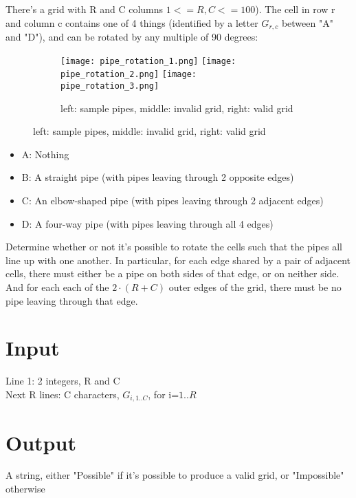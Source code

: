 

There's a grid with R and C columns $1 <= R, C <= 100$). The cell in row r and column c contains 
one of 4 things (identified by a letter $G_{r,c}$ between "A" and "D"), and can be rotated by any multiple 
of 90 degrees:


\begin{figure}[h]
  \begin{subfigure}{\linewidth}
    \texttt{[image: pipe\_rotation\_1.png]} \hfill
    \texttt{[image: pipe\_rotation\_2.png]} \hfill
    \texttt{[image: pipe\_rotation\_3.png]}
    \caption{left: sample pipes, middle: invalid grid, right: valid grid}
  \end{subfigure}
\end{figure}

\begin{itemize}
  \item A: Nothing 
  \item B: A straight pipe (with pipes leaving through 2 opposite edges) 
  \item C: An elbow-shaped pipe (with pipes leaving through 2 adjacent edges) 
  \item D: A four-way pipe (with pipes leaving through all 4 edges)
\end{itemize}


Determine whether or not it's possible to rotate the cells such that the pipes all 
line up with one another. In particular, for each edge shared by a pair of adjacent cells, 
there must either be a pipe on both sides of that edge, or on neither side. 
And for each each of the $2 \cdot (R+C)$ outer edges of the grid, there must be no pipe leaving through that edge.


\section*{Input}
Line 1: 2 integers, R and C \\
Next R lines: C characters, $G_{i,1..C}$, for i=$1..R$ \\

\section*{Output}
A string, either "Possible" if it's possible to produce a valid grid, or "Impossible" otherwise
